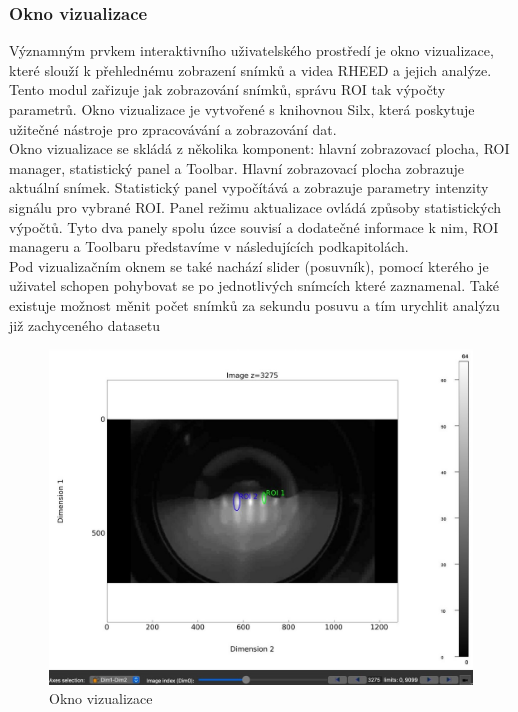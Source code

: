 \documentclass[a4paper,11pt]{article}
\begin{document}
\subsubsection{Okno vizualizace}
Významným prvkem interaktivního uživatelského prostředí je okno vizualizace, které slouží k přehlednému zobrazení snímků a videa RHEED a jejich analýze. Tento modul zařizuje jak zobrazování snímků, správu ROI tak výpočty parametrů. Okno vizualizace je vytvořené s knihovnou Silx, která poskytuje užitečné nástroje pro zpracovávání a zobrazování dat.\\

Okno vizualizace se skládá z několika komponent: hlavní zobrazovací plocha, ROI manager, statistický panel a Toolbar. Hlavní zobrazovací plocha zobrazuje aktuální snímek. Statistický panel vypočítává a zobrazuje parametry intenzity signálu pro vybrané ROI. Panel režimu aktualizace ovládá způsoby statistických výpočtů. Tyto dva panely spolu úzce souvisí a dodatečné informace k nim, ROI manageru a Toolbaru představíme v následujících podkapitolách.\\

Pod vizualizačním oknem se také nachází slider (posuvník), pomocí kterého je uživatel schopen pohybovat se po jednotlivých snímcích které zaznamenal. Také existuje možnost měnit počet snímků za sekundu posuvu a tím urychlit analýzu již zachyceného datasetu\\

\begin{figure}
    \centering
    \includegraphics[width=1\textwidth]{images/GUI.jpg}
    \caption{Okno vizualizace}
\end{figure}
\end{document}

